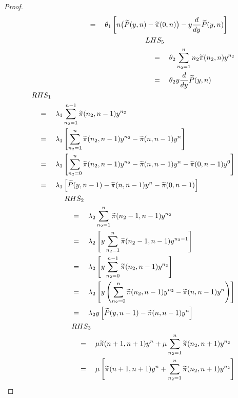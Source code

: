 \begin{proof}
\begin{align*}
\begin{split}
            & \quad = \quad \theta_1 \left[ n \big( \widetilde{P}(y,n) - \tpi(0,n) \big) - y \frac{d}{dy} \widetilde{P}(y,n) \right]
        \end{split} \\
        \begin{split}
            & LHS_5 \\
            & \quad = \quad \theta_2 \sum_{n_2=1}^{n} n_2 \tpi(n_2,n) y^{n_2} \\
            & \quad = \quad \theta_2 y \frac{d}{dy} \widetilde{P}(y,n)
        \end{split} \\
        \begin{split}
            & RHS_1 \\
            & \quad = \quad \lambda_1 \sum_{n_2=1}^{n-1} \tpi(n_2,n-1) y^{n_2} \\
            & \quad = \quad \lambda_1 \left[ \sum_{n_2=1}^{n} \tpi(n_2,n-1) y^{n_2} - \tpi(n,n-1) y^n \right] \\
            & \quad = \quad \lambda_1 \left[ \sum_{n_2=0}^{n} \tpi(n_2,n-1) y^{n_2} - \tpi(n,n-1) y^n - \tpi(0,n-1) y^0 \right] \\
            & \quad = \quad \lambda_1 \left[ \widetilde{P}(y,n-1) - \tpi(n,n-1) y^n - \tpi(0,n-1) \right]
        \end{split} \\
        \begin{split}
            & RHS_2 \\
            & \quad = \quad \lambda_2 \sum_{n_2=1}^{n} \tpi(n_2-1,n-1) y^{n_2} \\
            & \quad = \quad \lambda_2 \left[ y \sum_{n_2=1}^{n} \tpi(n_2-1,n-1) y^{n_2-1} \right] \\
            & \quad = \quad \lambda_2 \left[ y \sum_{n_2=0}^{n-1} \tpi(n_2,n-1) y^{n_2} \right] \\
            & \quad = \quad \lambda_2 \left[ y \left( \sum_{n_2=0}^{n} \tpi(n_2,n-1) y^{n_2} - \tpi(n,n-1) y^n \right) \right] \\
            & \quad = \quad \lambda_2 y \left[ \widetilde{P}(y,n-1) - \tpi(n,n-1) y^n \right]
        \end{split} \\
        \begin{split}
            & RHS_3 \\
            & \quad = \quad \mu \tpi(n+1,n+1) y^n + \mu \sum_{n_2=1}^{n} \tpi(n_2,n+1) y^{n_2} \\
            & \quad = \quad \mu \left[ \tpi(n+1,n+1) y^n + \sum_{n_2=1}^{n} \tpi(n_2,n+1) y^{n_2} \right] \\

\end{split}
\end{align*}
\end{proof}
